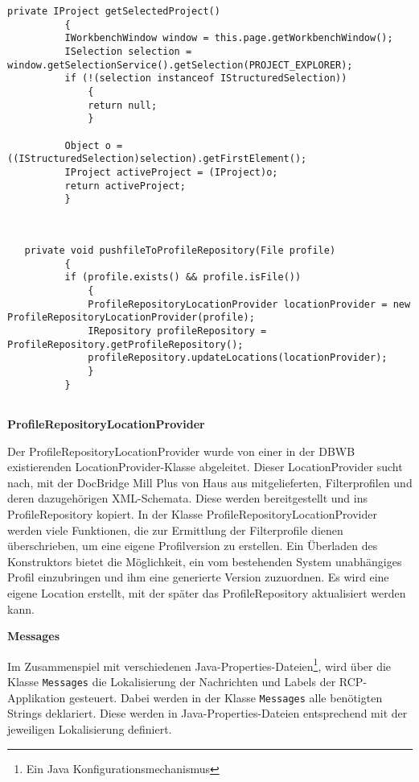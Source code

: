 {{{{{\begin{lstlisting}[caption={Nutzung eines Selection Services, um das gewähle Projekt zu ermitteln},label=lst:selectionService]
  private IProject getSelectedProject()
          {
          IWorkbenchWindow window = this.page.getWorkbenchWindow();
          ISelection selection = window.getSelectionService().getSelection(PROJECT_EXPLORER);
          if (!(selection instanceof IStructuredSelection))
              {
              return null;
              }
  
          Object o = ((IStructuredSelection)selection).getFirstElement();
          IProject activeProject = (IProject)o;
          return activeProject;
          }
      
 \end{lstlisting}





 \begin{lstlisting}[caption={Methode, um Filterprofil im ProfileRepository abzulegen},label=lst:pushToRepo]
   
   private void pushfileToProfileRepository(File profile)
          {
          if (profile.exists() && profile.isFile())
              {
              ProfileRepositoryLocationProvider locationProvider = new ProfileRepositoryLocationProvider(profile);
              IRepository profileRepository = ProfileRepository.getProfileRepository();
              profileRepository.updateLocations(locationProvider);
              }
          }
      
 \end{lstlisting}


}

\textbf{ProfileRepositoryLocationProvider}{

Der ProfileRepositoryLocationProvider wurde von einer in der \ac{DBWB} existierenden LocationProvider-Klasse abgeleitet. Dieser LocationProvider sucht nach, mit der DocBridge Mill Plus von Haus aus mitgelieferten, Filterprofilen und deren dazugehörigen XML-Schemata. Diese werden bereitgestellt und ins ProfileRepository kopiert. In der Klasse ProfileRepositoryLocationProvider werden viele Funktionen, die zur Ermittlung der Filterprofile dienen überschrieben, um eine eigene Profilversion zu erstellen. Ein Überladen des Konstruktors bietet die Möglichkeit, ein vom bestehenden System unabhängiges Profil einzubringen und ihm eine generierte Version zuzuordnen. Es wird eine eigene Location erstellt, mit der später das ProfileRepository aktualisiert werden kann.

}
\textbf{Messages}{

Im Zusammenspiel mit verschiedenen Java-Properties-Dateien\footnote{Ein Java Konfigurationsmechanismus}, wird über die Klasse \texttt{Messages} die Lokalisierung der Nachrichten und Labels der \ac{RCP}-Applikation gesteuert. Dabei werden in der Klasse \texttt{Messages} alle benötigten \glspl{String} deklariert. Diese werden in Java-Properties-Dateien entsprechend mit der jeweiligen Lokalisierung definiert.

}}}}}
